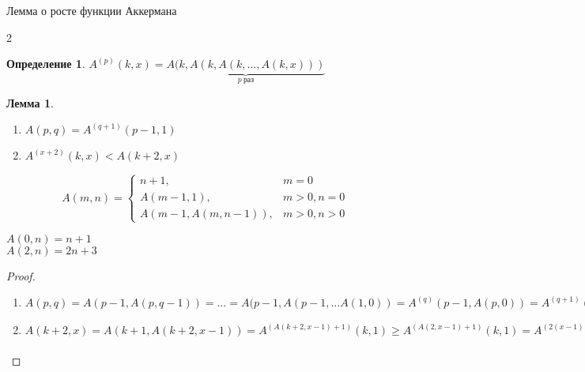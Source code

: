 \documentclass[aspectratio=169]{beamer}
\newtheorem{dfn}{Определение}[section]
\newtheorem{lmm}{Лемма}[section]
\begin{document}
\begin{frame}{Лемма о росте функции Аккермана}
\begin{multicols}{2}
\begin{dfn}$A^{(p)}(k,x) = \underbrace{A(k,A(k,A(k,\dots,A(k,x)))}_{p\ \text{раз}}$\end{dfn}
\begin{lmm}
\begin{enumerate}
\item $A(p,q) = A^{(q+1)}(p-1,1)$
\item $A^{(x+2)}(k,x) < A(k+2,x)$
\end{enumerate}\end{lmm}
\columnbreak

\color{gray}\footnotesize
$$A(m,n) = \left\{\begin{array}{ll}
  n+1,&m = 0\\
  A(m-1,1),&m > 0, n = 0\\
  A(m-1,A(m,n-1)),&m > 0, n > 0
\end{array}\right.$$

$A(0,n) = n+1$ \\

$A(2,n) = 2n + 3$

\end{multicols}

\vspace{-0.5cm}
\begin{proof}
\begin{enumerate}
\item $A(p,q) = A(p-1,A(p,q-1)) = \dots = A(p-1,A(p-1,\dots A(1,0)) = A^{(q)}(p-1,A(p,0)) = A^{(q+1)}(p-1,1)$

\item

$A(k+2,x) = A(k+1,A(k+2,x-1)) = A^{(A(k+2,x-1)+1)}(k,1) \ge A^{(A(2,x-1)+1)}(k,1) = A^{(2(x-1)+3+1)}(k,1)
= A^{(2x+2)}(k,1) = A^{(x+2)}(k,A^{(x)}(k,1)) \ge A^{(x+2)}(k,A^{(x)}(0,1)) = A^{(x+2)}(k,x+1) > A^{(x+2)}(k,x)$

\end{enumerate}
\end{proof}
\end{frame}
\end{document}
